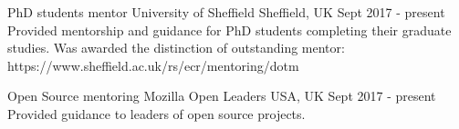


\begin{cventries}


\cventry
{PhD students mentor} %
{University of Sheffield} %
{Sheffield, UK} %
{Sept 2017 - present} %
{Provided mentorship and guidance for PhD students completing their graduate studies. 
Was awarded the distinction of outstanding mentor: https://www.sheffield.ac.uk/rs/ecr/mentoring/dotm}

\cventry
{Open Source mentoring}
{Mozilla Open Leaders}
{USA, UK}
{Sept 2017 - present}
{
Provided guidance to leaders of open source projects.
}


\end{cventries}